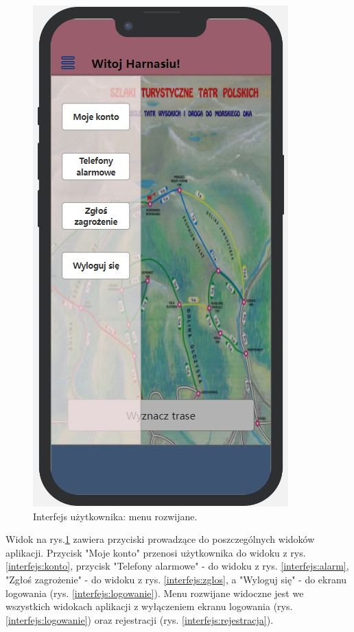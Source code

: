      \begin{figure}[H]
        \centering
        \includegraphics[scale=0.5]{img/interfejsy/if_menu.jpg}
        \caption{Interfejs użytkownika: menu rozwijane.}
        \label{interfejs:menu}
    \end{figure}
    Widok na rys.\ref{interfejs:menu} zawiera przyciski prowadzące do poszczególnych widoków aplikacji. Przycisk "Moje konto" przenosi użytkownika do widoku z rys. \ref{interfejs:konto}, przycisk "Telefony alarmowe" - do widoku z rys. \ref{interfejs:alarm}, "Zgłoś zagrożenie" - do widoku z rys. \ref{interfejs:zglos}, a "Wyloguj się" - do ekranu logowania (rys. \ref{interfejs:logowanie}). Menu rozwijane widoczne jest we wszystkich widokach aplikacji z wyłączeniem ekranu logowania (rys. \ref{interfejs:logowanie}) oraz rejestracji (rys. \ref{interfejs:rejestracja}). \\
